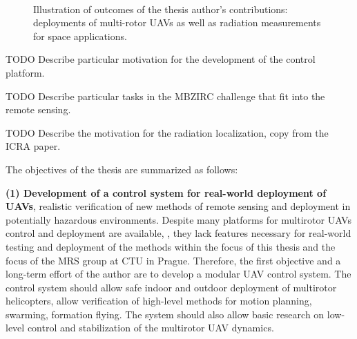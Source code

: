 \documentclass[a4paper,11pt,titlepage,twoside]{book}
\newcommand{\todo}[1]{{\color{red} TODO {#1}}}
\begin{document}
\begin{figure}
{  }\\
  \vspace{-0.3em}
  \caption{Illustration of outcomes of the thesis author's contributions: deployments of multi-rotor \acp{UAV} as well as radiation measurements for space applications.}
  \label{fig:collage}
\end{figure}

\todo{Describe particular motivation for the development of the control platform.}

\todo{Describe particular tasks in the MBZIRC challenge that fit into the remote sensing.}

\todo{Describe the motivation for the radiation localization, copy from the ICRA paper.}

The objectives of the thesis are summarized as follows:

\textbf{(1) Development of a control system for real-world deployment of \acp{UAV}}, realistic verification of new methods of remote sensing and deployment in potentially hazardous environments.
Despite many platforms for multirotor \acp{UAV} control and deployment are available, \cite{sanchez2016aerostack, xiao2020xtdrone, furrer2016rotors, schmittle2018openuav, abeywardena2015design, mellado2013mavwork}, they lack features necessary for real-world testing and deployment of the methods within the focus of this thesis and the focus of the \acl{MRS} group at \ac{CTU} in Prague.
Therefore, the first objective and a long-term effort of the author are to develop a modular \ac{UAV} control system.
The control system should allow safe indoor and outdoor deployment of multirotor helicopters, allow verification of high-level methods for motion planning, swarming, formation flying.
The system should also allow basic research on low-level control and stabilization of the multirotor \ac{UAV} dynamics.
\end{document}
